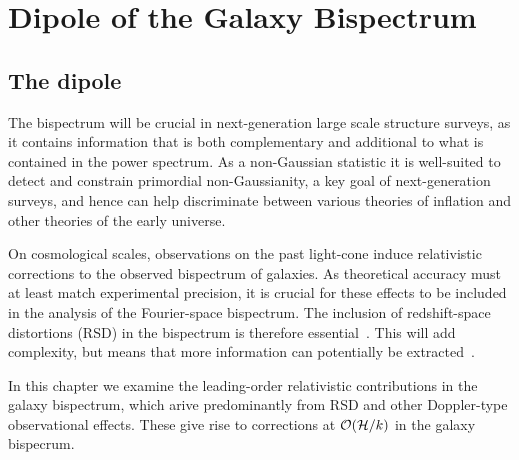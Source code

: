 \chapter{Dipole of the Galaxy Bispectrum}
\label{chapter:dipole}

\section{The dipole}

The bispectrum will be crucial in next-generation large scale structure surveys, as it contains information that is both complementary and additional to what is contained in the power spectrum. As a non-Gaussian statistic it is well-suited to detect and constrain primordial non-Gaussianity, a key goal of next-generation surveys, and hence can help discriminate between various theories of inflation and other theories of the early universe.

On cosmological scales, observations on the past light-cone induce relativistic corrections to the observed bispectrum of galaxies. As theoretical accuracy must at least match experimental precision, it is crucial for these effects to be included in the analysis of the Fourier-space bispectrum. The inclusion of redshift-space distortions (RSD) in the bispectrum is therefore essential~\citep{Verde:1998zr,Scoccimarro:1999ed}. This will add complexity, but means that more information can potentially be extracted~\citep{Tellarini:2016sgp}.

In this chapter we examine the leading-order relativistic contributions in the galaxy bispectrum, which arive predominantly from RSD and other Doppler-type observational effects. These give rise to corrections at $\mathcal{O}(\mathcal{H}/k)$ in the galaxy bispecrum.


